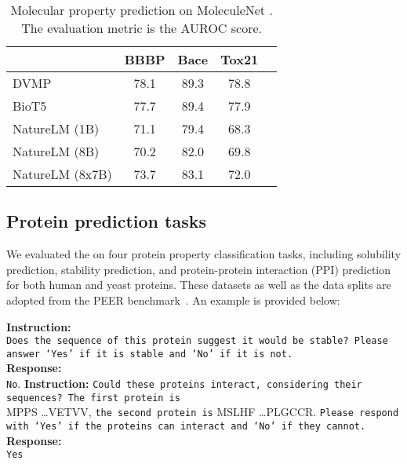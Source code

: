 \begin{table}[!htpb]
\centering
\begin{tabular}{lcccc}
\toprule
& BBBP & Bace & Tox21  \\
\midrule
DVMP \cite{2021jinhuaDVMP} & 78.1 & 89.3 & 78.8 \\
BioT5 \cite{PeiQizhi2023BioT5} & 77.7 & 89.4 & 77.9  \\
NatureLM (1B) & 71.1 & 79.4 & 68.3 \\
NatureLM (8B) & 70.2 & 82.0 & 69.8 \\
NatureLM (8x7B) & 73.7 & 83.1 & 72.0\\
\bottomrule
\end{tabular}
\caption{Molecular property prediction on MoleculeNet \cite{moleculenetpaper}. The evaluation metric is the AUROC score. }
\label{tab:molnet}
\end{table}

\subsection{Protein prediction tasks}

We evaluated the \ourM{} on four protein property classification tasks, including solubility prediction, stability prediction, and protein-protein interaction (PPI) prediction for both human and yeast proteins. These datasets as well as the data splits are adopted from the PEER benchmark~\cite{xu2022peer}. An example is provided below:

\begin{example}
\textbf{Instruction:}\\
\texttt{Does the sequence of this protein suggest it would be stable? Please answer `Yes' if it is stable and `No' if it is not.} \pro{}\epro{} \\
\textbf{Response:} \\
\texttt{No}.
\newline
\newline
\noindent\textbf{Instruction:} \texttt{Could these proteins interact, considering their sequences? The first protein is} \\
\pro{}MPPS \ldots VETVV\epro{}, \texttt{the second protein is} \pro{}MSLHF \ldots PLGCCR\epro{}. \texttt{Please respond with `Yes' if the proteins can interact and `No' if they cannot.} \\
\textbf{Response:} \\
\texttt{Yes} 
\end{example}  


